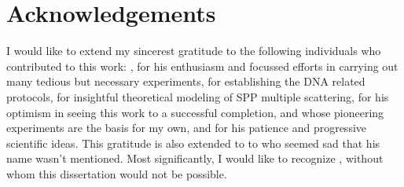\chapter*{Acknowledgements}
I would like to extend my sincerest gratitude to the following individuals
who contributed to this work: , for his enthusiasm and
focussed efforts in carrying out many tedious but necessary experiments,
 for establishing the DNA related protocols,
 for insightful theoretical modeling of SPP multiple
scattering,  for his optimism in seeing this work to a
successful completion,  and 
whose pioneering experiments are the basis for my own, and 
for his patience and progressive scientific ideas. This gratitude is also
extended to to  who seemed sad that his name wasn't
mentioned.  Most significantly, I would like to recognize
, without whom this dissertation would not be
possible.
